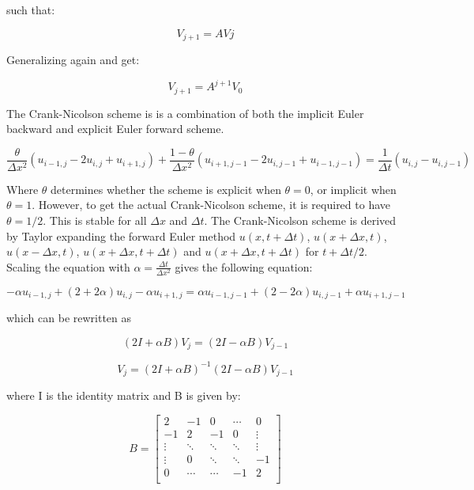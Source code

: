 \documentclass[10pt,a4paper]{article}
\begin{document}
\noindent such that:

\begin{equation}
V_{j+1} = AVj
\end{equation}

\noindent Generalizing again and get:

\begin{equation}
V_{j+1}= A^{j+1}V_{0}
\end{equation}

\noindent The Crank-Nicolson scheme is is a combination of both the implicit Euler backward and explicit Euler forward scheme.

\begin{equation}
\frac{\theta}{\Delta x^2}(u_{i-1,j} - 2u_{i,j} + u_{i+1,j}) + \frac{1 - \theta}{\Delta x^2}(u_{i+1,j-1} - 2u_{i,j-1} + u_{i-1,j-1}) = \frac{1}{\Delta t}(u_{i,j} - u_{i,j-1})
\end{equation}

\noindent Where $\theta$ determines whether the scheme is explicit when $\theta = 0$, or implicit when $\theta = 1$. However, to get the actual Crank-Nicolson scheme, it is required to have $\theta = 1/2$. This is stable for all $\Delta x$ and $\Delta t$. The Crank-Nicolson scheme is derived by Taylor expanding the forward Euler method $u(x,t + \Delta t)$, $u(x + \Delta x,t)$, $u(x - \Delta x,t)$, $u(x + \Delta x, t + \Delta t)$ and $u(x + \Delta x, t + \Delta t)$ for $t + \Delta t/2$.\\

\noindent Scaling the equation with $\alpha = \frac{\Delta t}{\Delta x^2}$ gives the following equation:

\begin{equation}
-\alpha u_{i-1,j} + (2 + 2\alpha)u_{i,j} -\alpha u_{i+1,j} = \alpha u_{i-1,j-1} + (2-2\alpha)u_{i,j-1} + \alpha u_{i+1,j-1}
\end{equation}

\noindent which can be rewritten as

\begin{equation}
(2I + \alpha B)V_j = (2I - \alpha B)V_{j-1}
\end{equation}

\begin{equation}
V_j = (2I + \alpha B)^{-1}(2I - \alpha B)V_{j-1}
\end{equation}

\noindent where I is the identity matrix and B is given by:

\begin{equation}
B = \begin{bmatrix}
2 & -1 & 0 & \cdots &0\\
-1 & 2 & -1 & 0 & \vdots\\
\vdots & \ddots & \ddots & \ddots & \vdots\\
\vdots & 0 & \ddots & \ddots & -1\\
0 & \cdots & \cdots & -1 & 2\\
\end{bmatrix}
\end{equation}
\end{document}
